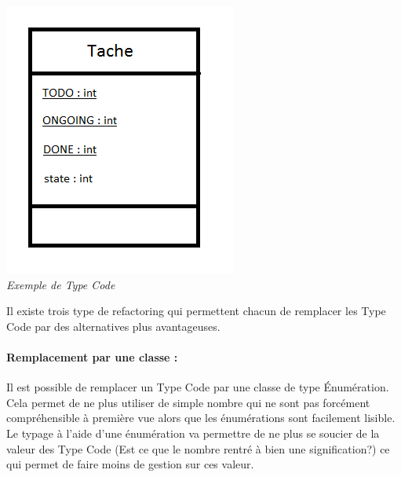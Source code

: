 \documentclass[a4paper,twoside,12pt,openright]{report}
\begin{document}
\begin{center}
\includegraphics[scale=1]{Image/TypeCode.png}\\
\itshape{Exemple de Type Code}
\end{center}

Il existe trois type de refactoring qui permettent chacun de remplacer les Type Code par des alternatives plus avantageuses.

\paragraph{Remplacement par une classe :}
Il est possible de remplacer un Type Code par une classe de type Énumération.\\
Cela permet de ne plus utiliser de simple nombre qui ne sont pas forcément compréhensible à première vue alors que les énumérations sont facilement lisible.\\
Le typage à l'aide d'une énumération va permettre de ne plus se soucier de la valeur des Type Code (Est ce que le nombre rentré à bien une signification?) ce qui permet de faire moins de gestion sur ces valeur.
\end{document}
